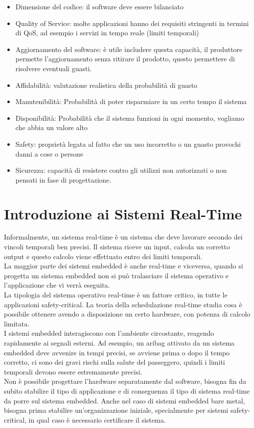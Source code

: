 \documentclass{article}
\begin{document}
\begin{itemize}
\item Dimensione del codice: il software deve essere bilanciato
\item Quality of Service: molte applicazioni hanno dei requisiti stringenti in termini di QoS, ad esempio i servizi in tempo reale (limiti temporali)
\item Aggiornamento del software: è utile includere questa capacità, il produttore permette l'aggiornamento senza ritirare il prodotto, questo permettere di risolvere eventuali guasti.
\item Affidabilità: valutazione realistica della probabilità di guasto
\item Manutenibilità: Probabilità di poter risparmiare in un certo tempo il sistema
\item Disponibilità: Probabilità che il sistema funzioni in ogni momento, vogliamo che abbia un valore alto
\item Safety: proprietà legata al fatto che un uso incorretto o un guasto provochi danni a cose o persone
\item Sicurezza: capacità di resistere contro gli utilizzi non autorizzati o non pensati in fase di progettazione. 
\end{itemize}
\section{Introduzione ai Sistemi Real-Time}
Informalmente, un sistema real-time è un sistema che deve lavorare secondo dei vincoli temporali ben precisi. Il sistema riceve un input, calcola un corretto output e questo calcolo viene effettuato entro dei limiti temporali.\\ La maggior parte dei sistemi embedded è anche real-time e viceversa, quando si progetta un sistema embedded non si può tralasciare il sistema operativo e l'applicazione che vi verrà eseguita.\\ La tipologia del sistema operativo real-time è un fattore critico, in tutte le applicazioni safety-critical. La teoria della schedulazione real-time studia cosa è possibile ottenere avendo a disposizione un certo hardware, con potenza di calcolo limitata.\\ I sistemi embedded interagiscono con l'ambiente circostante, reagendo rapidamente ai segnali esterni. Ad esempio, un aribag attivato da un sistema embedded deve avvenire in tempi precisi, se avviene prima o dopo il tempo corretto, ci sono dei gravi rischi sulla salute del passeggero, quindi i limiti temporali devono essere estremamente precisi.\\ Non è possibile progettare l'hardware separatamente dal software, bisogna fin da subito stabilire il tipo di applicazione e di conseguenza il tipo di sistema real-time da porre sul sistema embedded. Anche nel caso di sistemi embedded bare metal, bisogna prima stabilire un'organizzazione iniziale, specialmente per sistemi safety-critical, in qual caso è necessario certificare il sistema.
\end{document}
